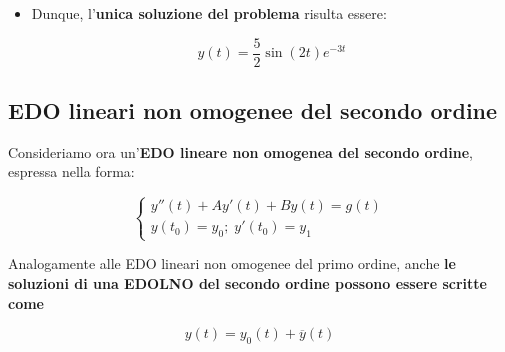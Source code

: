\documentclass[a4paper, 12pt]{report}
\begin{document}
\begin{itemize}
\begin{itemize}
            $$
            \left \{ \begin{array}{l}
                0 = e^{0} [C \cdot \cos(0) + D \cdot \sin(0)] = C\\
                5 = -3e^{0} [C \cdot \cos(0) + D \cdot \sin(0)] + e^{0} [-2C \cdot \sin(0) + 2D \cdot \cos(0)] = -3C+2D
            \end{array}\right .
            $$
            
            $$ 
            \left \{ \begin{array}{l}
                C = 0 \\
                5 = -3 \cdot 0 + 2D
            \end{array}\right .
            \qquad \Longrightarrow \qquad
            \left \{ \begin{array}{l}
                C = 0 \\
                D = \frac{5}{2}
            \end{array}\right .
            $$
            
            \item Dunque, l'\textbf{unica soluzione del problema} risulta essere:
            
            \[ y(t) = \frac{5}{2} \sin(2t) e^{-3t}\]
            
            
        \end{itemize}
    \end{itemize}
    
    \quad
    
    \subsection{EDO lineari non omogenee del secondo ordine}
    
    Consideriamo ora un'\textbf{EDO lineare non omogenea del secondo ordine}, espressa nella forma:
    
    $$ 
    \left \{ \begin{array}{l}
        y''(t)+Ay'(t)+By(t)=g(t) \\
        y(t_0) = y_0; \; y'(t_0) = y_1
    \end{array}\right .
    $$
    
    Analogamente alle EDO lineari non omogenee del primo ordine, anche \textbf{le soluzioni di una EDOLNO del secondo ordine possono essere scritte come}
    
    \[ y(t) = y_0(t) + \overline{y}(t)\]
    
\end{document}
